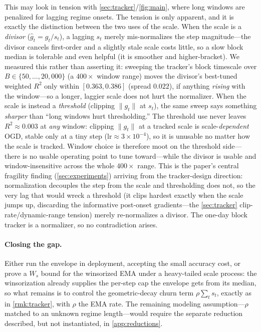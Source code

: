 \documentclass{article}
\newcommand{\norm}[1]{\lVert #1 \rVert}
\newcommand{\gt}{g_t}
\begin{document}
This may look in tension with \cref{sec:tracker}/\cref{fig:main}, where long windows are
penalized for lagging regime onsets. The tension is only apparent, and it is exactly the
distinction between the two uses of the scale. When the scale is a \emph{divisor}
($\hat{g}_t=\gt/s_t$), a lagging $s_t$ merely mis-normalizes the step magnitude---the divisor
cancels first-order and a slightly stale scale costs little, so a slow block median is
tolerable and even helpful (it is smoother and higher-bracket). We measured this rather than
asserting it: sweeping the tracker's block timescale over $B\in\{50,\dots,20{,}000\}$ (a
$400\times$ window range) moves the divisor's best-tuned weighted $R^2$ only within
$[0.363,0.386]$ (spread $0.022$), if anything \emph{rising} with the window---so a longer,
laggier scale does not hurt the normalizer. When the scale is instead a \emph{threshold}
(clipping $\norm{\gt}$ at $s_t$), the same sweep says something \emph{sharper} than ``long
windows hurt thresholding.'' The threshold use never leaves $R^2\approx0.003$ at \emph{any}
window: clipping $\norm{\gt}$ at a tracked scale is scale-\emph{dependent} OGD, stable only at
a tiny step ($\mathrm{lr}\approx3\times10^{-4}$), so it is unusable no matter how the scale is
tracked. Window choice is therefore moot on the threshold side---there is no usable operating
point to tune toward---while the divisor is usable and window-insensitive across the whole
$400\times$ range. This is the paper's central fragility finding (\cref{sec:experiments})
arriving from the tracker-design direction: normalization decouples the step from the scale and
thresholding does not, so the very lag that would wreck a threshold (it clips hardest exactly
when the scale jumps up, discarding the informative post-onset gradients---the
\cref{sec:tracker} clip-rate/dynamic-range tension) merely re-normalizes a divisor. The
one-day block tracker is a normalizer, so no contradiction arises.

\paragraph{Closing the gap.} Either run the envelope in deployment, accepting the small
accuracy cost, or prove a $W_s$ bound for the winsorized EMA under a heavy-tailed scale
process: the winsorization already supplies the per-step cap the envelope gets from its
median, so what remains is to control the geometric-decay churn term $\rho\sum_t s_t$,
exactly as in \cref{rmk:tracker}, with $\rho$ the EMA rate. The
remaining modeling assumption---$\rho$ matched to an unknown regime length---would require
the separate reduction described, but not instantiated, in \cref{app:reductions}.
\end{document}
